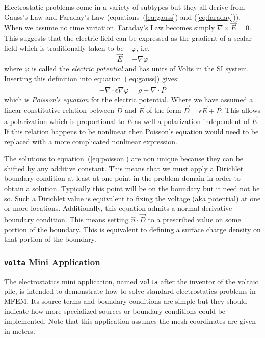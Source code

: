 \documentclass{article}
\newcommand{\refEq}[1]{(\ref{eq:#1})}
\newcommand{\Div}{\nabla\!\cdot\!}
\newcommand{\Curl}{\nabla\!\times\!}
\newcommand{\Grad}{\nabla\!}
\begin{document}
Electrostatic problems come in a variety of subtypes but they all
derive from Gauss's Law and Faraday's Law (equations~\refEq{gauss} and
\refEq{faraday}).  When we assume no time variation, Faraday's Law
becomes simply $\Curl\vec{E}=0$. This suggests that the electric field
can be expressed as the gradient of a scalar field which is
traditionally taken to be $-\varphi$, i.e.
\begin{equation}
\vec{E} = -\Grad\varphi \label{eq:gradphi}
\end{equation}
where $\varphi$ is called the {\em electric potential} and has units
of Volts in the SI system.  Inserting this definition into
equation~\refEq{gauss} gives:
\begin{equation}
-\Div\epsilon\Grad\varphi = \rho - \Div\vec{P}\label{eq:poisson}
\end{equation}
which is {\em Poisson's equation} for the electric potential.  Where
we have assumed a linear constitutive relation between $\vec{D}$ and
$\vec{E}$ of the form $\vec{D}=\epsilon\vec{E}+\vec{P}$.  This allows
a polarization which is proportional to $\vec{E}$ as well a
polarization independent of $\vec{E}$. If this relation happens to be
nonlinear then Poisson's equation would need to be replaced with a
more complicated nonlinear expression.

The solutions to equation~\refEq{poisson} are non unique because they
can be shifted by any additive constant.  This means that we must
apply a Dirichlet boundary condition at least at one point in the
problem domain in order to obtain a solution.  Typically this point
will be on the boundary but it need not be so.  Such a Dirichlet value
is equivalent to fixing the voltage (aka potential) at one or more
locations.  Additionally, this equation admits a normal derivative
boundary condition.  This means setting $\hat{n}\cdot\vec{D}$ to a
prescribed value on some portion of the boundary.  This is equivalent
to defining a surface charge density on that portion of the boundary.

\subsubsection{{\tt volta} Mini Application}

The electrostatics mini application, named {\tt volta} after the
inventor of the voltaic pile, is intended to demonstrate how to solve
standard electrostatics problems in MFEM.  Its source terms and
boundary conditions are simple but they should indicate how more
specialized sources or boundary conditions could be implemented.  Note
that this application assumes the mesh coordinates are given in
meters.
\end{document}
